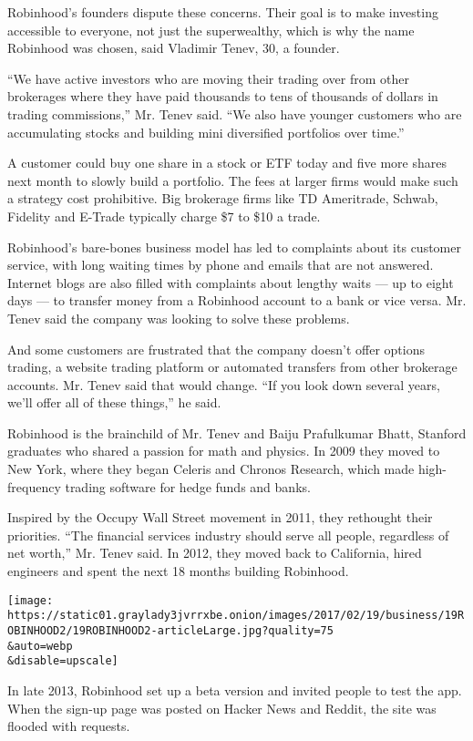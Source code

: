 Robinhood's founders dispute these concerns. Their goal is to make
investing accessible to everyone, not just the superwealthy, which is
why the name Robinhood was chosen, said Vladimir Tenev, 30, a founder.

``We have active investors who are moving their trading over from other
brokerages where they have paid thousands to tens of thousands of
dollars in trading commissions,'' Mr. Tenev said. ``We also have younger
customers who are accumulating stocks and building mini diversified
portfolios over time.''

A customer could buy one share in a stock or ETF today and five more
shares next month to slowly build a portfolio. The fees at larger firms
would make such a strategy cost prohibitive. Big brokerage firms like TD
Ameritrade, Schwab, Fidelity and E-Trade typically charge \$7 to \$10 a
trade.

Robinhood's bare-bones business model has led to complaints about its
customer service, with long waiting times by phone and emails that are
not answered. Internet blogs are also filled with complaints about
lengthy waits --- up to eight days --- to transfer money from a
Robinhood account to a bank or vice versa. Mr. Tenev said the company
was looking to solve these problems.

And some customers are frustrated that the company doesn't offer options
trading, a website trading platform or automated transfers from other
brokerage accounts. Mr. Tenev said that would change. ``If you look down
several years, we'll offer all of these things,'' he said.

Robinhood is the brainchild of Mr. Tenev and Baiju Prafulkumar Bhatt,
Stanford graduates who shared a passion for math and physics. In 2009
they moved to New York, where they began Celeris and Chronos Research,
which made high-frequency trading software for hedge funds and banks.

Inspired by the Occupy Wall Street movement in 2011, they rethought
their priorities. ``The financial services industry should serve all
people, regardless of net worth,'' Mr. Tenev said. In 2012, they moved
back to California, hired engineers and spent the next 18 months
building Robinhood.

\texttt{[image: https://static01.graylady3jvrrxbe.onion/images/2017/02/19/business/19ROBINHOOD2/19ROBINHOOD2-articleLarge.jpg?quality=75\\\&auto=webp\\\&disable=upscale]}

In late 2013, Robinhood set up a beta version and invited people to test
the app. When the sign-up page was posted on Hacker News and Reddit, the
site was flooded with requests.

